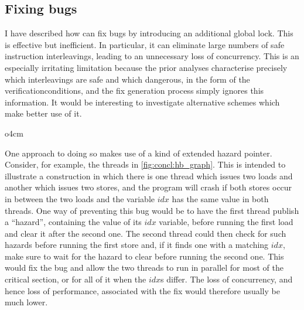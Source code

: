 \subsection{Fixing bugs}

I have described how {\technique} can fix bugs by introducing an
additional global lock.  This is effective but inefficient.  In
particular, it can eliminate large numbers of safe instruction
interleavings, leading to an unnecessary loss of concurrency.  This is
an especially irritating limitation because the prior analyses
characterise precisely which interleavings are safe and which
dangerous, in the form of the \glspl{verificationcondition}, and the
fix generation process simply ignores this information.  It would be
interesting to investigate alternative schemes which make better use
of it.

\begin{wrapfigure}{o}{4cm}
  \vspace{-12pt}
  \vspace{-12pt}
\end{wrapfigure}
One approach to doing so makes use of a kind of extended hazard
pointer\cite{Michael2004}.  Consider, for example, the threads in
\autoref{fig:concl:hb_graph}.  This is intended to illustrate a
construction in which there is one thread which issues two loads and
another which issues two stores, and the program will crash if both
stores occur in between the two loads and the variable $\mathit{idx}$
has the same value in both threads.  One way of preventing this bug
would be to have the first thread publish a ``hazard'', containing the
value of its $\mathit{idx}$ variable, before running the first load
and clear it after the second one.  The second thread could then check
for such hazards before running the first store and, if it finds one
with a matching $\mathit{idx}$, make sure to wait for the hazard to
clear before running the second one.  This would fix the bug and allow
the two threads to run in parallel for most of the critical section,
or for all of it when the $\mathit{idx}$s differ.  The loss of
concurrency, and hence loss of performance, associated with the fix
would therefore usually be much lower.

